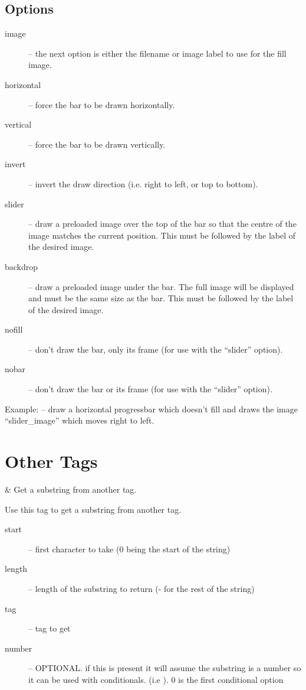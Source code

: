 \subsection{Options}
\begin{description}
  \item[image] -- the next option is either the filename or image label to
    use for the fill image.
  \item[horizontal] -- force the bar to be drawn horizontally.
  \item[vertical] -- force the bar to be drawn vertically.
  \item[invert] -- invert the draw direction (i.e. right to left, or top to
    bottom).
  \item[slider] -- draw a preloaded image over the top of the bar so that
    the centre of the image matches the current position. This must be
    followed by the label of the desired image.
  \item[backdrop] -- draw a preloaded image under the bar. The full
    image will be displayed and must be the same size as the bar. 
    This must be followed by the label of the desired image.
  \item[nofill] -- don't draw the bar, only its frame (for use with the
     ``slider'' option).
  \item[nobar] -- don't draw the bar or its frame (for use with the
    ``slider'' option).
\end{description}

Example:  -- draw
a horizontal progressbar which doesn't fill and draws the image
``slider\_image'' which moves right to left.


\section{Other Tags}

\begin{tagmap}
   & Get a substring from another tag.\\
\end{tagmap}
    Use this tag to get a substring from another tag.
\begin{description}
    \item[start] -- first character to take (0 being the start of the string)
    \item[length] -- length of the substring to return (- for the rest of the string)
    \item[tag] -- tag to get
    \item[number] -- OPTIONAL. if this is present it will assume the
            substring is a number so it can be used with conditionals. (i.e ).
            0 is the first conditional option
\end{description}
    
